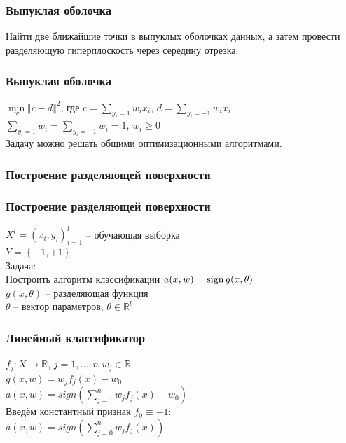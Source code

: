 \documentclass[12pt]{beamer}
\begin{document}
\begin{frame}\frametitle{Выпуклая оболочка}
Найти две ближайшие точки в выпуклых
оболочках данных, а затем провести разделяющую
гиперплоскость через середину отрезка.
\end{frame}

\begin{frame}\frametitle{Выпуклая оболочка}
$\min\limits_w \Vert c - d \Vert^2$, где $c = \sum\limits_{y_i = 1} w_ix_i$,  $d = \sum\limits_{y_i = -1} w_ix_i$\\
\vspace{5mm}
$\sum\limits_{y_i = 1}w_i = \sum\limits_{y_i = -1}w_i = 1$, $w_i \geq 0$\\
\vspace{5mm}
Задачу можно решать общими оптимизационными алгоритмами.
\end{frame}

\begin{frame}\frametitle{Построение разделяющей поверхности}
\end{frame}


\begin{frame}\frametitle{Построение разделяющей поверхности}
${X^l = (x_i,y_i)_{i = 1}^l}$ -- обучающая выборка\\ 
${Y=\left\{-1,+1\right\}}$\\
\vspace{5mm}
Задача:\\
Построить алгоритм классификации ${a(x,w) = \operatorname{sign} g(x,\theta)}$\\\vspace{5mm}
${g(x,\theta)}$ -- разделяющая функция\\
$\theta$ -- вектор параметров, $\theta \in \mathbb{R}^l$
\end{frame}


\begin{frame}\frametitle{Линейный классификатор}
$f_j: X \rightarrow \mathbb{R}$, $j = 1,\dots, n$ \hspace{5mm} $w_j \in \mathbb{R}$\\
$g(x, w) = w_jf_j(x) - w_0$\\
\vspace{5mm}
$a(x, w) = sign(\sum\limits_{j=1}^n w_jf_j(x) - w_0)$\\

\vspace{7mm}
Введём константный признак $f_0 \equiv -1$:\\
$a(x, w) = sign(\sum\limits_{j=0}^n w_jf_j(x))$\\
\end{frame}
\end{document}
